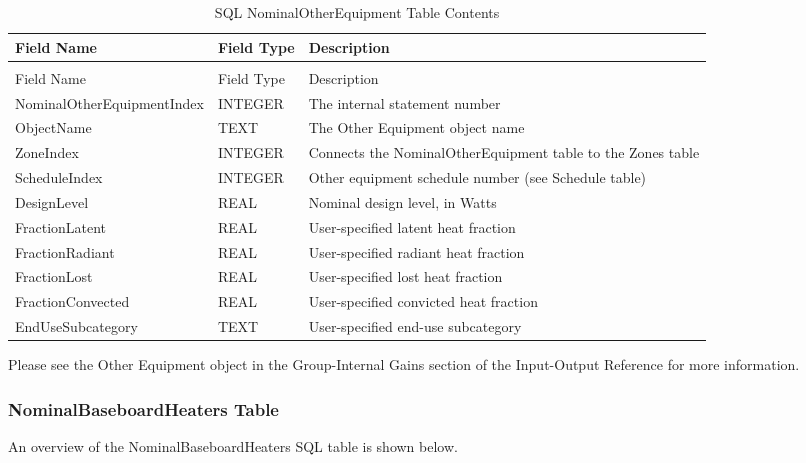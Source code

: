 \begin{longtable}[c]{p{1.5in}p{1.5in}p{2.99in}}
\caption{SQL NominalOtherEquipment Table Contents \label{table:table-21.-sql-nominalotherequipment-table}} \tabularnewline
\toprule 
Field Name & Field Type & Description \tabularnewline
\midrule
\endfirsthead

\caption[]{SQL NominalOtherEquipment Table Contents} \tabularnewline
\toprule 
Field Name & Field Type & Description \tabularnewline
\midrule
\endhead

NominalOtherEquipmentIndex & INTEGER & The internal statement number \tabularnewline
ObjectName & TEXT & The Other Equipment object name \tabularnewline
ZoneIndex & INTEGER & Connects the NominalOtherEquipment table to the Zones table \tabularnewline
ScheduleIndex & INTEGER & Other equipment schedule number (see Schedule table) \tabularnewline
DesignLevel & REAL & Nominal design level, in Watts \tabularnewline
FractionLatent & REAL & User-specified latent heat fraction \tabularnewline
FractionRadiant & REAL & User-specified radiant heat fraction \tabularnewline
FractionLost & REAL & User-specified lost heat fraction \tabularnewline
FractionConvected & REAL & User-specified convicted heat fraction \tabularnewline
EndUseSubcategory & TEXT & User-specified end-use subcategory \tabularnewline
\bottomrule
\end{longtable}

Please see the Other Equipment object in the Group-Internal Gains section of the Input-Output Reference for more information.

\subsubsection{NominalBaseboardHeaters Table}

An overview of the NominalBaseboardHeaters SQL table is shown below.

